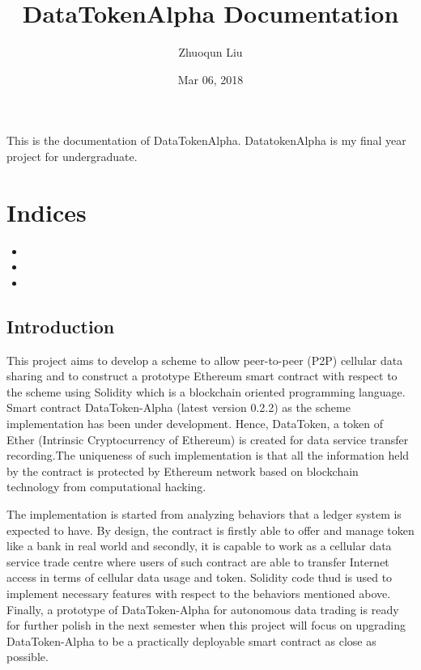 \documentclass[letterpaper,10pt,english]{sphinxmanual}
\title{DataTokenAlpha Documentation}
\date{Mar 06, 2018}
\author{Zhuoqun Liu}
\begin{document}
\maketitle
\sphinxtableofcontents
{}\label{\detokenize{index::doc}}


This is the documentation of DataTokenAlpha.
DatatokenAlpha is my final year project for undergraduate.


\chapter{Indices}
\label{\detokenize{index:indices}}\label{\detokenize{index:welcome-to-the-documentation-of-datatokenalpha}}\begin{itemize}
\item {} 

\item {} 

\item {} 

\end{itemize}


\section{Introduction}
\label{\detokenize{index:introduction}}
This project aims to develop a scheme to allow peer-to-peer (P2P) cellular data sharing and to
construct a prototype Ethereum smart contract with respect to the scheme using Solidity which is
a blockchain oriented programming language. Smart contract DataToken-Alpha (latest version 0.2.2)
as the scheme implementation has been under development. Hence, DataToken, a token of Ether
(Intrinsic Cryptocurrency of Ethereum) is created for data service transfer recording.The uniqueness
of such implementation is that all the information held by the contract is protected by Ethereum
network based on blockchain technology from computational hacking.

The implementation is started from analyzing behaviors that a ledger system is expected to have.
By design, the contract is firstly able to offer and manage token like a bank in real world
and secondly, it is capable to work as a cellular data service trade centre where users of such
contract are able to transfer Internet access in terms of cellular data usage and token.
Solidity code thud is used to implement necessary features with respect to the behaviors mentioned above.
Finally, a prototype of DataToken-Alpha for autonomous data trading is ready for further polish
in the next semester when this project will focus on upgrading DataToken-Alpha to be a practically
deployable smart contract as close as possible.
\end{document}
